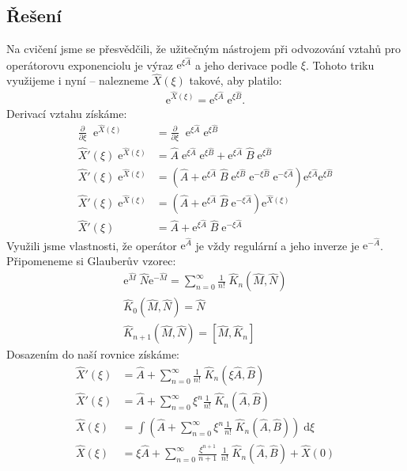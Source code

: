 \documentclass[10pt,a4paper]{article}
\newcommand{\const}[1]{\text{#1}}
\renewcommand{\d}[1]{\;\const{d}#1}
\newcommand{\pd}[2]{\frac{\partial  #1}{\partial  #2} \;}
\newcommand{\e}[1]{\const{e}^{#1}}
\begin{document}
\subsection{Řešení}
Na cvičení jsme se přesvědčili, že užitečným nástrojem při odvozování vztahů pro operátorovu exponenciolu je výraz $\e{\xi \hat A}$ a jeho derivace podle $\xi$. Tohoto triku využijeme i nyní – nalezneme $\hat X(\xi)$ takové, aby platilo:
\begin{align*}
    \e{\hat X(\xi)} = \e{\xi \hat A} \; \e{\xi \hat B}.
\end{align*}
Derivací vztahu získáme:
\begin{align*}
    \pd{}{\xi} \; \e{\hat X(\xi)} &= \pd{}{\xi} \; \e{\xi \hat A} \; \e{\xi \hat B}
    \\[10pt]
    \hat X'(\xi) \; \e{\hat X(\xi)} &= \hat A \; \e{\xi \hat A} \; \e{\xi \hat B} + \e{\xi \hat A} \; \hat B \; \e{\xi \hat B}
    \\[10pt]
    \hat X'(\xi) \; \e{\hat X(\xi)} &= \left( \hat A  + \e{\xi \hat A} \; \hat B \; \e{\xi \hat B} \; \e{-\xi \hat B} \; \e{-\xi \hat A} \right) \e{\xi \hat A} \e{\xi \hat B}
    \\[10pt]
    \hat X'(\xi) \; \e{\hat X(\xi)} &= \left( \hat A  + \e{\xi \hat A} \; \hat B \; \e{-\xi \hat A} \right) \e{\hat X(\xi)}
    \\[10pt]
    \hat X'(\xi) &= \hat A  + \e{\xi \hat A} \; \hat B \; \e{-\xi \hat A}
\end{align*}
Využili jsme vlastnosti, že operátor $\e{\hat A}$ je vždy regulární a jeho inverze je $\e{-\hat A}$. Připomeneme si Glauberův vzorec:
\begin{gather*}
    \e{\hat M} \; \hat N \e{-\hat M}
    = \sum_{n=0}^\infty \frac{1}{n!} \; \hat K_n(\hat M, \hat N)
    \\[10pt]
    \hat K_0(\hat M, \hat N) = \hat N
    \\[10pt]
    \hat K_{n+1}(\hat M, \hat N) = \left[ \hat M, \hat K_n \right]
\end{gather*}
Dosazením do naší rovnice získáme:
\begin{align*}
    \hat X'(\xi) &= \hat A + \sum_{n=0}^\infty \frac{1}{n!} \; \hat K_n(\xi \hat A, \hat B)
    \\[10pt]
    \hat X'(\xi) &= \hat A + \sum_{n=0}^\infty \xi^n \frac{1}{n!} \; \hat K_n(\hat A, \hat B)
    \\[10pt]
    \hat X(\xi) &= \int \left( \hat A + \sum_{n=0}^\infty \xi^n \frac{1}{n!} \; \hat K_n(\hat A, \hat B) \right) \d{\xi}
    \\[10pt]
    \hat X(\xi) &= \xi \hat A + \sum_{n=0}^\infty \frac{\xi^{n+1}}{n+1} \; \frac{1}{n!} \; \hat K_n(\hat A, \hat B) + \hat X(0)
\end{align*}
\end{document}
